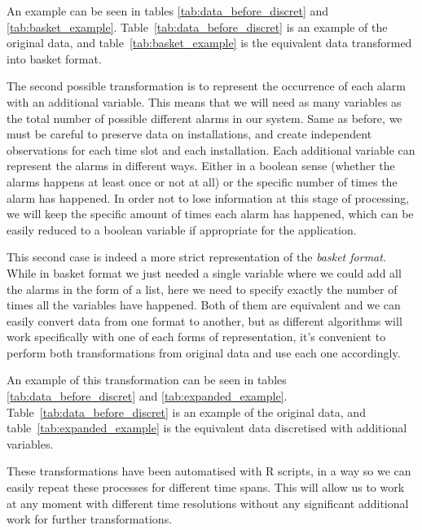 An example can be seen in tables \ref{tab:data_before_discret} and \ref{tab:basket_example}. Table~\ref{tab:data_before_discret} is an example of the original data, and table~\ref{tab:basket_example} is the equivalent data transformed into basket format.

The second possible transformation is to represent the occurrence of each alarm with an additional variable. This means that we will need as many variables as the total number of possible different alarms in our system. Same as before, we must be careful to preserve data on installations, and create independent observations for each time slot and each installation. Each additional variable can represent the alarms in different ways. Either in a boolean sense (whether the alarms happens at least once or not at all) or the specific number of times the alarm has happened. In order not to lose information at this stage of processing, we will keep the specific amount of times each alarm has happened, which can be easily reduced to a boolean variable if appropriate for the application.

This second case is indeed a more strict representation of the \emph{basket format}. While in basket format we just needed a single variable where we could add all the alarms in the form of a list, here we need to specify exactly the number of times all the variables have happened. Both of them are equivalent and we can easily convert data from one format to another, but as different algorithms will work specifically with one of each forms of representation, it's convenient to perform both transformations from original data and use each one accordingly.

An example of this transformation can be seen in tables \ref{tab:data_before_discret} and \ref{tab:expanded_example}. Table~\ref{tab:data_before_discret} is an example of the original data, and table~\ref{tab:expanded_example} is the equivalent data discretised with additional variables.

These transformations have been automatised with R scripts, in a way so we can easily repeat these processes for different time spans. This will allow us to work at any moment with different time resolutions without any significant additional work for further transformations.

